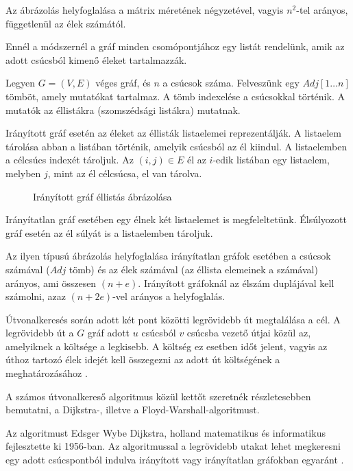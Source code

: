 Az ábrázolás helyfoglalása a mátrix méretének négyzetével, vagyis $n^2$-tel arányos, függetlenül az élek számától.


Ennél a módszernél a gráf minden csomópontjához egy listát rendelünk, amik az adott csúcsból kimenő éleket tartalmazzák.

Legyen $G = (V, E)$ véges gráf, és $n$ a csúcsok száma. Felveszünk egy $Adj[1 \ldots n]$ tömböt, amely mutatókat tartalmaz. A tömb indexelése a csúcsokkal történik. A mutatók az éllistákra (szomszédsági listákra) mutatnak.

Irányított gráf esetén az éleket az éllisták listaelemei reprezentálják. A listaelem tárolása abban a listában történik, amelyik csúcsból az él kiindul. A listaelemben a célcsúcs indexét tároljuk. Az $(i, j) \in E$ él az $i$-edik listában egy listaelem, melyben $j$, mint az él célcsúcsa, el van tárolva.

\begin{figure}
\centering

\caption{Irányított gráf éllistás ábrázolása}
\label{fig:ellista_iranyitott}
\end{figure}

Irányítatlan gráf esetében egy élnek két listaelemet is megfeleltetünk. Élsúlyozott gráf esetén az él súlyát is a listaelemben tároljuk.

Az ilyen típusú ábrázolás helyfoglalása irányítatlan gráfok esetében a csúcsok számával ($Adj$ tömb) és az élek számával (az éllista elemeinek a számával) arányos, ami összesen $(n + e)$. Irányított gráfoknál az élszám duplájával kell számolni, azaz $(n + 2e)$-vel arányos a helyfoglalás.


Útvonalkeresés során adott két pont közötti legrövidebb út megtalálása a cél. A legrövidebb út a $G$ gráf adott $u$ csúcsból $v$ csúcsba vezető útjai közül az, amelyiknek a költsége a legkisebb. A költség ez esetben időt jelent, vagyis az úthoz tartozó élek idejét kell összegezni az adott út költségének a meghatározásához \cite{legrovidebbut}.


A számos útvonalkereső algoritmus közül kettőt szeretnék részletesebben bemutatni, a Dijkstra-, illetve a Floyd-Warshall-algoritmust.


Az algoritmust Edsger Wybe Dijkstra, holland matematikus és informatikus fejlesztette ki 1956-ban. Az algoritmussal a legrövidebb utakat lehet megkeresni egy adott csúcspontból indulva irányított vagy irányítatlan gráfokban egyaránt \cite{dijkstra}.

